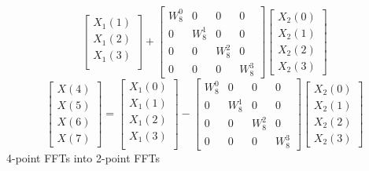 \documentclass[journal,12pt,twocolumn]{IEEEtran}
\renewcommand\thesection{\arabic{section}}
\begin{document}
\begin{enumerate}[label=\thesection.\arabic*]
\begin{enumerate}[label=\arabic*.,ref=\thesection.\theenumi]
\begin{equation}
\begin{bmatrix}
         X_{1}(1)\\ 
         X_{1}(2)\\
         X_{1}(3)\\
       \end{bmatrix}
       +
       \begin{bmatrix}
         W^{0}_{8} & 0 & 0 & 0\\
         0 & W^{1}_{8} & 0 & 0\\
         0 & 0 & W^{2}_{8} & 0\\
         0 & 0 & 0 & W^{3}_{8}
       \end{bmatrix}
       \begin{bmatrix}
         X_{2}(0) \\ 
         X_{2}(1) \\ 
         X_{2}(2) \\
         X_{2}(3)
       \end{bmatrix}
     \end{equation}
     \begin{equation}
       \begin{bmatrix}
         X(4) \\ 
         X(5) \\ 
         X(6) \\ 
         X(7)
       \end{bmatrix}
       =
       \begin{bmatrix}
         X_{1}(0) \\ 
         X_{1}(1)\\ 
         X_{1}(2)\\
         X_{1}(3)\\
       \end{bmatrix}
       -
       \begin{bmatrix}
         W^{0}_{8} & 0 & 0 & 0\\
         0 & W^{1}_{8} & 0 & 0\\
         0 & 0 & W^{2}_{8} & 0\\
         0 & 0 & 0 & W^{3}_{8}
       \end{bmatrix}
       \begin{bmatrix}
         X_{2}(0) \\ 
         X_{2}(1) \\ 
         X_{2}(2) \\
         X_{2}(3)
       \end{bmatrix}
     \end{equation}
     4-point FFTs into 2-point FFTs
     \begin{equation}

\end{equation}
\end{enumerate}
\end{enumerate}
\end{document}
